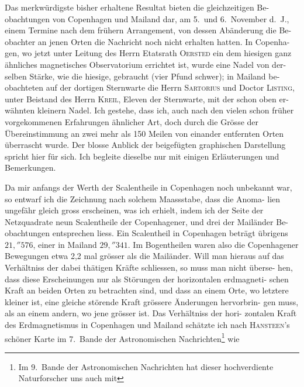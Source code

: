 \documentclass[12pt,a4paper]{article}
\begin{document}
Das merkwürdigste bisher erhaltene Resultat bieten die gleichzeitigen Be-
obachtungen von Copenhagen und Mailand dar, am 5.\ und 6.\ November d.\ J., 
einem Termine nach dem frühern Arrangement, von dessen Abänderung die Be-
obachter an jenen Orten die Nachricht noch nicht erhalten hatten. In Copenha-
gen, wo jetzt unter Leitung des Herrn Etatsrath \textsc{Oersted} ein dem hiesigen ganz 
ähnliches magnetisches Observatorium errichtet ist, wurde eine Nadel von der-
selben Stärke, wie die hiesige, gebraucht (vier Pfund schwer); in Mailand be-
obachteten auf der dortigen Sternwarte die Herrn \textsc{Sartorius} und Doctor \textsc{Listing}, 
unter Beistand des Herrn \textsc{Kreil}, Eleven der Sternwarte, mit der schon oben er-
wähnten kleinern Nadel. Ich gestehe, dass ich, auch nach den vielen schon 
früher vorgekommenen Erfahrungen ähnlicher Art, doch durch die Grösse der 
Übereinstimmung an zwei mehr als 150 Meilen von einander entfernten Orten 
überrascht wurde. Der blosse Anblick der beigefügten graphischen Darstellung 
spricht hier für sich. Ich begleite dieselbe nur mit einigen Erläuterungen und 
Bemerkungen.

Da mir anfangs der Werth der Scalentheile in Copenhagen noch unbekannt 
war, so entwarf ich die Zeichnung nach solchem Maassstabe, dass die Anoma-
lien ungefähr gleich gross erscheinen, was ich erhielt, indem ich der Seite der 
Netzquadrate neun Scalentheile der Copenhagener, und drei der Mailänder Be-
obachtungen entsprechen liess. Ein Scalentheil in Copenhagen beträgt übrigens 
$21{,}''576$, einer in Mailand $29{,}''341$. Im Bogentheilen waren also die Copenhagener 
Bewegungen etwa 2,2 mal grösser als die Mailänder. Will man hieraus auf 
das Verhältniss der dabei thätigen Kräfte schliessen, so muss man nicht überse-
hen, dass diese Erscheinungen nur als Störungen der horizontalen erdmagneti-
schen Kraft an beiden Orten zu betrachten sind, und dass an einem Orte, wo 
letztere kleiner ist, eine gleiche störende Kraft grössere Änderungen hervorbrin-
gen muss, als an einem andern, wo jene grösser ist. Das Verhältniss der hori-
zontalen Kraft des Erdmagnetismus in Copenhagen und Mailand schätzte ich nach 
\textsc{Hansteen}'s schöner Karte im 7.\ Bande der Astronomischen Nachrichten\footnote{Im 9.\ Bande der Astronomischen Nachrichten hat dieser hochverdiente Naturforscher uns auch mit} 
wie
\end{document}

